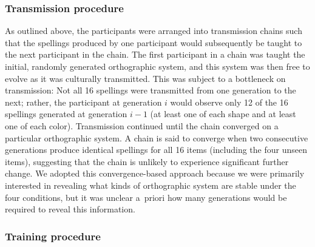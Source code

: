 \documentclass[doc,biblatex]{apa7}
\begin{document}
\subsubsection{Transmission procedure}

As outlined above, the participants were arranged into transmission chains such that the spellings produced by one participant would subsequently be taught to the next participant in the chain. The first participant in a chain was taught the initial, randomly generated orthographic system, and this system was then free to evolve as it was culturally transmitted. This was subject to a bottleneck on transmission: Not all 16 spellings were transmitted from one generation to the next; rather, the participant at generation $i$ would observe only 12 of the 16 spellings generated at generation $i-1$ (at least one of each shape and at least one of each color). Transmission continued until the chain converged on a particular orthographic system. A chain is said to converge when two consecutive generations produce identical spellings for all 16 items (including the four unseen items), suggesting that the chain is unlikely to experience significant further change. We adopted this convergence-based approach because we were primarily interested in revealing what kinds of orthographic system are stable under the four conditions, but it was unclear a~priori how many generations would be required to reveal this information.

\subsubsection{Training procedure}
\end{document}
